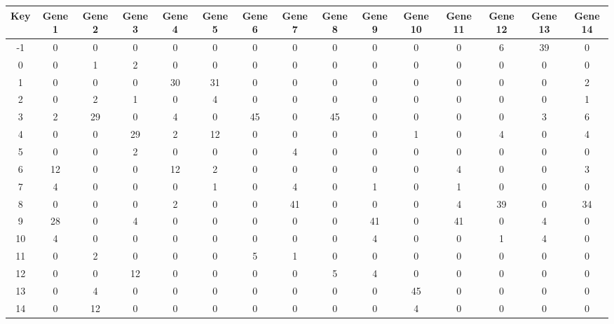\begin{tabular}{|c|c|c|c|c|c|c|c|c|c|c|c|c|c|c|}
\hline
Key & Gene 1 & Gene 2 & Gene 3 & Gene 4 & Gene 5 & Gene 6 & Gene 7 & Gene 8 & Gene 9 & Gene 10 & Gene 11 & Gene 12 & Gene 13 & Gene 14 \\
\hline
-1 & 0 & 0 & 0 & 0 & 0 & 0 & 0 & 0 & 0 & 0 & 0 & 6 & 39 & 0 \\
0 & 0 & 1 & 2 & 0 & 0 & 0 & 0 & 0 & 0 & 0 & 0 & 0 & 0 & 0 \\
1 & 0 & 0 & 0 & 30 & 31 & 0 & 0 & 0 & 0 & 0 & 0 & 0 & 0 & 2 \\
2 & 0 & 2 & 1 & 0 & 4 & 0 & 0 & 0 & 0 & 0 & 0 & 0 & 0 & 1 \\
3 & 2 & 29 & 0 & 4 & 0 & 45 & 0 & 45 & 0 & 0 & 0 & 0 & 3 & 6 \\
4 & 0 & 0 & 29 & 2 & 12 & 0 & 0 & 0 & 0 & 1 & 0 & 4 & 0 & 4 \\
5 & 0 & 0 & 2 & 0 & 0 & 0 & 4 & 0 & 0 & 0 & 0 & 0 & 0 & 0 \\
6 & 12 & 0 & 0 & 12 & 2 & 0 & 0 & 0 & 0 & 0 & 4 & 0 & 0 & 3 \\
7 & 4 & 0 & 0 & 0 & 1 & 0 & 4 & 0 & 1 & 0 & 1 & 0 & 0 & 0 \\
8 & 0 & 0 & 0 & 2 & 0 & 0 & 41 & 0 & 0 & 0 & 4 & 39 & 0 & 34 \\
9 & 28 & 0 & 4 & 0 & 0 & 0 & 0 & 0 & 41 & 0 & 41 & 0 & 4 & 0 \\
10 & 4 & 0 & 0 & 0 & 0 & 0 & 0 & 0 & 4 & 0 & 0 & 1 & 4 & 0 \\
11 & 0 & 2 & 0 & 0 & 0 & 5 & 1 & 0 & 0 & 0 & 0 & 0 & 0 & 0 \\
12 & 0 & 0 & 12 & 0 & 0 & 0 & 0 & 5 & 4 & 0 & 0 & 0 & 0 & 0 \\
13 & 0 & 4 & 0 & 0 & 0 & 0 & 0 & 0 & 0 & 45 & 0 & 0 & 0 & 0 \\
14 & 0 & 12 & 0 & 0 & 0 & 0 & 0 & 0 & 0 & 4 & 0 & 0 & 0 & 0 \\
\hline
\end{tabular}